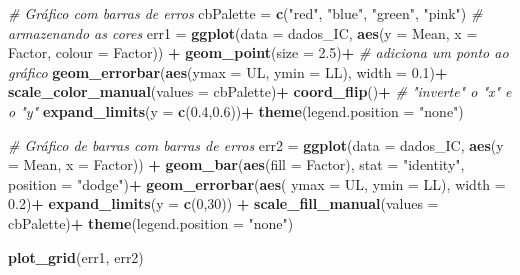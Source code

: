 \documentclass[
]{book}
\newenvironment{Shaded}{\begin{snugshade}}{\end{snugshade}}
\newcommand{\CommentTok}[1]{\textcolor[rgb]{0.56,0.35,0.01}{\textit{#1}}}
\newcommand{\DataTypeTok}[1]{\textcolor[rgb]{0.13,0.29,0.53}{#1}}
\newcommand{\DecValTok}[1]{\textcolor[rgb]{0.00,0.00,0.81}{#1}}
\newcommand{\FloatTok}[1]{\textcolor[rgb]{0.00,0.00,0.81}{#1}}
\newcommand{\KeywordTok}[1]{\textcolor[rgb]{0.13,0.29,0.53}{\textbf{#1}}}
\newcommand{\NormalTok}[1]{#1}
\newcommand{\OperatorTok}[1]{\textcolor[rgb]{0.81,0.36,0.00}{\textbf{#1}}}
\newcommand{\StringTok}[1]{\textcolor[rgb]{0.31,0.60,0.02}{#1}}
\begin{document}
\begin{Shaded}
\begin{Highlighting}[]
\CommentTok{# Gráfico com barras de erros}
\NormalTok{cbPalette =}\StringTok{ }\KeywordTok{c}\NormalTok{(}\StringTok{"red"}\NormalTok{, }\StringTok{"blue"}\NormalTok{, }\StringTok{"green"}\NormalTok{, }\StringTok{"pink"}\NormalTok{) }\CommentTok{# armazenando as cores}
\NormalTok{err1 =}\StringTok{ }\KeywordTok{ggplot}\NormalTok{(}\DataTypeTok{data =}\NormalTok{ dados_IC, }\KeywordTok{aes}\NormalTok{(}\DataTypeTok{y =}\NormalTok{ Mean, }\DataTypeTok{x =}\NormalTok{ Factor, }\DataTypeTok{colour =}\NormalTok{ Factor)) }\OperatorTok{+}\StringTok{ }
\StringTok{              }\KeywordTok{geom_point}\NormalTok{(}\DataTypeTok{size =} \FloatTok{2.5}\NormalTok{)}\OperatorTok{+}\StringTok{ }\CommentTok{# adiciona um ponto ao gráfico}
\StringTok{              }\KeywordTok{geom_errorbar}\NormalTok{(}\KeywordTok{aes}\NormalTok{(}\DataTypeTok{ymax =}\NormalTok{ UL, }\DataTypeTok{ymin =}\NormalTok{ LL), }\DataTypeTok{width =} \FloatTok{0.1}\NormalTok{)}\OperatorTok{+}
\StringTok{              }\KeywordTok{scale_color_manual}\NormalTok{(}\DataTypeTok{values =}\NormalTok{ cbPalette)}\OperatorTok{+}\StringTok{ }
\StringTok{              }\KeywordTok{coord_flip}\NormalTok{()}\OperatorTok{+}\StringTok{ }\CommentTok{# "inverte" o "x" e o "y" }
\StringTok{              }\KeywordTok{expand_limits}\NormalTok{(}\DataTypeTok{y =} \KeywordTok{c}\NormalTok{(}\FloatTok{0.4}\NormalTok{,}\FloatTok{0.6}\NormalTok{))}\OperatorTok{+}
\StringTok{              }\KeywordTok{theme}\NormalTok{(}\DataTypeTok{legend.position =} \StringTok{"none"}\NormalTok{)}

\CommentTok{# Gráfico de barras com barras de erros }
\NormalTok{err2 =}\StringTok{ }\KeywordTok{ggplot}\NormalTok{(}\DataTypeTok{data =}\NormalTok{ dados_IC, }\KeywordTok{aes}\NormalTok{(}\DataTypeTok{y =}\NormalTok{ Mean, }\DataTypeTok{x =}\NormalTok{ Factor)) }\OperatorTok{+}\StringTok{ }
\StringTok{              }\KeywordTok{geom_bar}\NormalTok{(}\KeywordTok{aes}\NormalTok{(}\DataTypeTok{fill =}\NormalTok{ Factor), }\DataTypeTok{stat =} \StringTok{"identity"}\NormalTok{, }\DataTypeTok{position =} \StringTok{"dodge"}\NormalTok{)}\OperatorTok{+}
\StringTok{              }\KeywordTok{geom_errorbar}\NormalTok{(}\KeywordTok{aes}\NormalTok{( }\DataTypeTok{ymax =}\NormalTok{ UL, }\DataTypeTok{ymin =}\NormalTok{ LL), }\DataTypeTok{width =} \FloatTok{0.2}\NormalTok{)}\OperatorTok{+}
\StringTok{              }\KeywordTok{expand_limits}\NormalTok{(}\DataTypeTok{y =} \KeywordTok{c}\NormalTok{(}\DecValTok{0}\NormalTok{,}\DecValTok{30}\NormalTok{)) }\OperatorTok{+}
\StringTok{              }\KeywordTok{scale_fill_manual}\NormalTok{(}\DataTypeTok{values =}\NormalTok{ cbPalette)}\OperatorTok{+}
\StringTok{              }\KeywordTok{theme}\NormalTok{(}\DataTypeTok{legend.position =} \StringTok{"none"}\NormalTok{)}

\KeywordTok{plot_grid}\NormalTok{(err1, err2)}
\end{Highlighting}
\end{Shaded}
\end{document}
